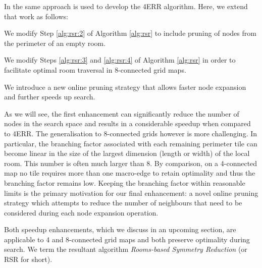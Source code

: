 In \cite{harabor10} the same approach is used to develop the 4ERR algorithm.
Here, we extend that work as follows:
\begin{enumerate}
\item{
We modify Step \ref{alg:rsr:2} of Algorithm \ref{alg:rsr} 
to include pruning of nodes from the perimeter of an empty room.
}
\item{
We modify Steps \ref{alg:rsr:3} and \ref{alg:rsr:4} of Algorithm
\ref{alg:rsr} in order to facilitate optimal room traversal in 8-connected grid
maps. 
\item{We introduce a new online pruning strategy that allows faster node
expansion and further speeds up search.}
}
\end{enumerate}
As we will see, the first enhancement can significantly reduce the number of nodes
in the search space and results in a considerable speedup when compared to 4ERR.
The generalisation to 8-connected grids however is more challenging.
In particular, the branching factor associated with each remaining perimeter tile 
can become linear in the size of the largest dimension (length or width) of the local room. 
This number is often much larger than 8. 
By comparison, on a 4-connected map no tile requires more than one macro-edge 
to retain optimality and thus the branching factor remains low. 
Keeping the branching factor within reasonable limits is the primary motivation
for our final enhancement: a novel online pruning strategy which attempts to
reduce the number of neighbours that need to be considered during each node 
expansion operation.
\par
Both speedup enhancements, which we discuss in an upcoming section,
are applicable to 4 and 8-connected grid maps and both preserve optimality
during search.
We term the resultant algorithm \emph{Rooms-based Symmetry Reduction} 
(or RSR for short).
